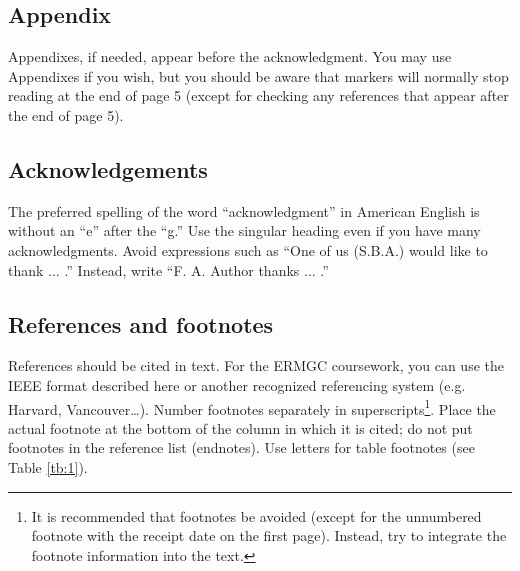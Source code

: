 \documentclass[conference]{IEEEtran}
\begin{document}
\subsection*{Appendix}

Appendixes, if needed, appear before the acknowledgment.  You may use Appendixes if you wish, but you should be aware that markers will normally stop reading at the end of page 5 (except for checking any references that appear after the end of page 5).

\subsection*{Acknowledgements}

The preferred spelling of the word “acknowledgment” in American English is without an “e” after the “g.” Use the singular heading even if you have many acknowledgments. Avoid expressions such as “One of us (S.B.A.) would like to thank ... .” Instead, write “F. A. Author thanks ... .” 

\subsection*{References and footnotes}

References should be cited in text. For the ERMGC coursework, you can use the IEEE format described here or another recognized referencing system (e.g. Harvard, Vancouver…).  
Number footnotes separately in superscripts\footnote{It is recommended that footnotes be avoided (except for the unnumbered footnote with the receipt date on the first page). Instead, try to integrate the footnote information into the text.}.  Place the actual footnote at the bottom of the column in which it is cited; do not put footnotes in the reference list (endnotes). Use letters for table footnotes (see Table \ref{tb:1}). 








\end{document}
